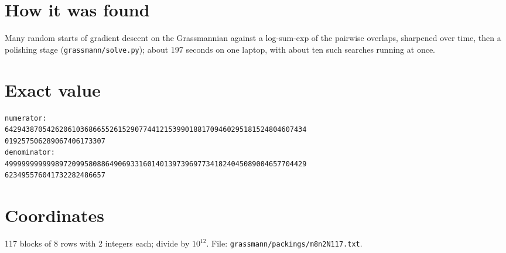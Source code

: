 \documentclass[11pt,a4paper]{article}
\begin{document}
\section{How it was found}
Many random starts of gradient descent on the Grassmannian against a log-sum-exp of the pairwise overlaps, sharpened over time, then a polishing stage (\texttt{grassmann/solve.py}); about 197 seconds on one laptop, with about ten such searches running at once.


\appendix
\section{Exact value}
{\small
\begin{verbatim}
numerator:
642943870542620610368665526152907744121539901881709460295181524804607434
019257506289067406173307
denominator:
499999999999897209958088649069331601401397396977341824045089004657704429
623495576041732282486657
\end{verbatim}}

\section{Coordinates}
117 blocks of 8 rows with 2 integers each; divide by $10^{12}$. File: \texttt{grassmann/packings/m8n2N117.txt}.
{\tiny
\begin{multicols}{4}
\end{multicols}}
\end{document}
